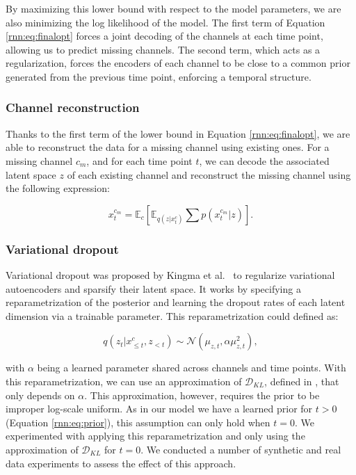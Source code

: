 By maximizing this lower bound with respect to the model parameters, we are also minimizing the log likelihood of the model. The first term of Equation \ref{rnn:eq:finalopt} forces a joint decoding of the channels at each time point, allowing us to predict missing channels. The second term, which acts as a regularization, forces the encoders of each channel to be close to a common prior generated from the previous time point, enforcing a temporal structure.

\subsubsection{Channel reconstruction}\label{sec:channelrec}
Thanks to the first term of the lower bound in Equation \ref{rnn:eq:finalopt}, we are able to reconstruct the data for a missing channel using existing ones. For a missing channel $c_{m}$, and for each time point $t$, we can decode the associated latent space $z$ of each existing channel and reconstruct the missing channel using the following expression:

\begin{equation}
    x^{c_m}_t = \mathbb{E}_{c} [ \mathbb{E}_{q(z|x^c_t)} \sum p(x^{c_m}_t|z) ].
\end{equation}

\subsubsection{Variational dropout} 

Variational dropout was proposed by Kingma et al.\ \cite{Kingma2015} to regularize variational autoencoders and sparsify their latent space. It works by specifying a reparametrization of the posterior and learning the dropout rates of each latent dimension via a trainable parameter. This reparametrization could defined as:

\begin{equation}
    \mathit{q}(z_t | x^c_{\leq t}, z_{< t}) \sim \mathcal{N}(\mu_{z,t},\alpha\mu_{z,t}^2),
\end{equation}

with $\alpha$ being a learned parameter shared across channels and time points. With this reparametrization, we can use an approximation of $\mathcal{D}_{KL}$, defined in \cite{Kingma2015}, that only depends on $\alpha$. This approximation, however, requires the prior to be improper log-scale uniform. As in our model we have a learned prior for $t>0$ (Equation \ref{rnn:eq:prior}), this assumption can only hold when $t=0$. We experimented with applying this reparametrization and only using the approximation of $\mathcal{D}_{KL}$ for $t=0$. We conducted a number of synthetic and real data experiments to assess the effect of this approach.

